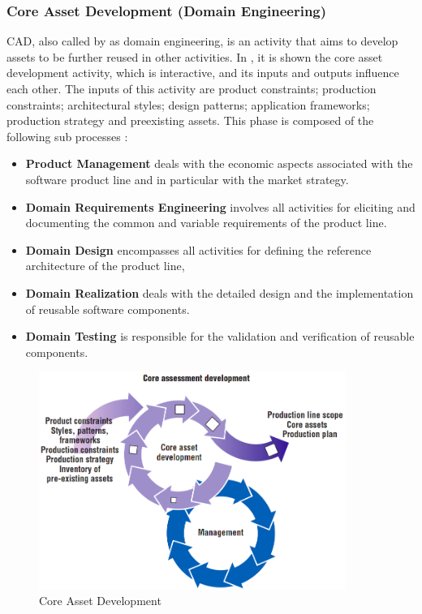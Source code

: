 \subsubsection{Core Asset Development (Domain Engineering)}
\acf{CAD}, also called by \citep{Pohl2005} as domain engineering, is an activity 
that aims to develop assets to be further reused in other activities. In , it is shown the core 
asset development activity, which is  interactive, and its inputs and outputs influence each other. The 
inputs of this activity are product constraints; production constraints; architectural styles; design 
patterns; application frameworks; production strategy and preexisting assets. This phase is composed of the 
following sub processes \citep{Pohl2005}:

\begin{itemize}
\item \textbf{Product Management} deals with the economic aspects associated with the software product line and in particular with the market strategy.
\item \textbf{Domain Requirements Engineering} involves all activities for eliciting and documenting the common and variable requirements of the product line.
\item \textbf{Domain Design} encompasses all activities for defining the reference architecture of the product line, 
\item \textbf{Domain Realization} deals with the detailed design and the implementation of reusable software components.
\item \textbf{Domain Testing} is responsible for the validation and verification of reusable components. 
\end{itemize}

\begin{figure}[htp]
\begin{center}
  \includegraphics[width=10cm]{chapters/background/img/SPLcoreasserts.png}
  \caption[Core Asset Development]{Core Asset Development \citep{clements2002software}}
  \label{fg:spl-coreasset}
\end{center}
\end{figure}

